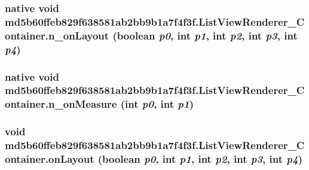 \hypertarget{classmd5b60ffeb829f638581ab2bb9b1a7f4f3f_1_1_list_view_renderer___container_66edf8a6315713af9814c8d7f2a5b4d9}{
\subsubsection[{n\_\-onLayout}]{\setlength{\rightskip}{0pt plus 5cm}native void md5b60ffeb829f638581ab2bb9b1a7f4f3f.ListViewRenderer\_\-Container.n\_\-onLayout (boolean {\em p0}, \/  int {\em p1}, \/  int {\em p2}, \/  int {\em p3}, \/  int {\em p4})}}
\label{classmd5b60ffeb829f638581ab2bb9b1a7f4f3f_1_1_list_view_renderer___container_66edf8a6315713af9814c8d7f2a5b4d9}


\hypertarget{classmd5b60ffeb829f638581ab2bb9b1a7f4f3f_1_1_list_view_renderer___container_d14617075bfb5728c9b9f37606d543ad}{
\subsubsection[{n\_\-onMeasure}]{\setlength{\rightskip}{0pt plus 5cm}native void md5b60ffeb829f638581ab2bb9b1a7f4f3f.ListViewRenderer\_\-Container.n\_\-onMeasure (int {\em p0}, \/  int {\em p1})}}
\label{classmd5b60ffeb829f638581ab2bb9b1a7f4f3f_1_1_list_view_renderer___container_d14617075bfb5728c9b9f37606d543ad}


\hypertarget{classmd5b60ffeb829f638581ab2bb9b1a7f4f3f_1_1_list_view_renderer___container_b2f05621c7c998e3bdbfbef1a0e32fad}{
\subsubsection[{onLayout}]{\setlength{\rightskip}{0pt plus 5cm}void md5b60ffeb829f638581ab2bb9b1a7f4f3f.ListViewRenderer\_\-Container.onLayout (boolean {\em p0}, \/  int {\em p1}, \/  int {\em p2}, \/  int {\em p3}, \/  int {\em p4})}}
\label{classmd5b60ffeb829f638581ab2bb9b1a7f4f3f_1_1_list_view_renderer___container_b2f05621c7c998e3bdbfbef1a0e32fad}


